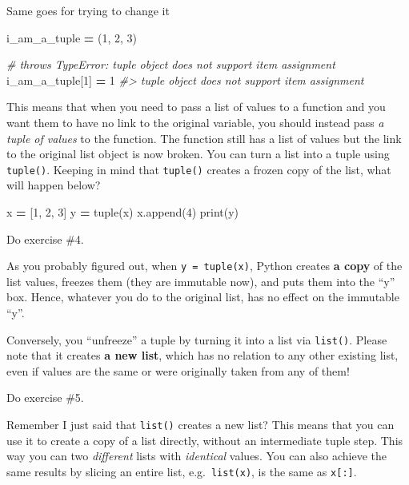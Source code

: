 \documentclass[
]{book}
\newenvironment{Shaded}{\begin{snugshade}}{\end{snugshade}}
\newcommand{\BuiltInTok}[1]{#1}
\newcommand{\CommentTok}[1]{\textcolor[rgb]{0.56,0.35,0.01}{\textit{#1}}}
\newcommand{\DecValTok}[1]{\textcolor[rgb]{0.00,0.00,0.81}{#1}}
\newcommand{\NormalTok}[1]{#1}
\newcommand{\OperatorTok}[1]{\textcolor[rgb]{0.81,0.36,0.00}{\textbf{#1}}}
\begin{document}
Same goes for trying to change it

\begin{Shaded}
\begin{Highlighting}[]
\NormalTok{i\_am\_a\_tuple }\OperatorTok{=}\NormalTok{ (}\DecValTok{1}\NormalTok{, }\DecValTok{2}\NormalTok{, }\DecValTok{3}\NormalTok{)}

\CommentTok{\# throws TypeError: \textquotesingle{}tuple\textquotesingle{} object does not support item assignment}
\NormalTok{i\_am\_a\_tuple[}\DecValTok{1}\NormalTok{] }\OperatorTok{=} \DecValTok{1} 
\CommentTok{\#\textgreater{} \textquotesingle{}tuple\textquotesingle{} object does not support item assignment}
\end{Highlighting}
\end{Shaded}

This means that when you need to pass a list of values to a function and you want them to have no link to the original variable, you should instead pass \emph{a tuple of values} to the function. The function still has a list of values but the link to the original list object is now broken. You can turn a list into a tuple using \texttt{tuple()}. Keeping in mind that \texttt{tuple()} creates a frozen copy of the list, what will happen below?

\begin{Shaded}
\begin{Highlighting}[]
\NormalTok{x }\OperatorTok{=}\NormalTok{ [}\DecValTok{1}\NormalTok{, }\DecValTok{2}\NormalTok{, }\DecValTok{3}\NormalTok{]}
\NormalTok{y }\OperatorTok{=} \BuiltInTok{tuple}\NormalTok{(x)}
\NormalTok{x.append(}\DecValTok{4}\NormalTok{)}
\BuiltInTok{print}\NormalTok{(y)}
\end{Highlighting}
\end{Shaded}

Do exercise \#4.

As you probably figured out, when \texttt{y\ =\ tuple(x)}, Python creates \textbf{a copy} of the list values, freezes them (they are immutable now), and puts them into the ``y'' box. Hence, whatever you do to the original list, has no effect on the immutable ``y''.

Conversely, you ``unfreeze'' a tuple by turning it into a list via \texttt{list()}. Please note that it creates \textbf{a new list}, which has no relation to any other existing list, even if values are the same or were originally taken from any of them!

Do exercise \#5.

Remember I just said that \texttt{list()} creates a new list? This means that you can use it to create a copy of a list directly, without an intermediate tuple step. This way you can two \emph{different} lists with \emph{identical} values. You can also achieve the same results by slicing an entire list, e.g.~\texttt{list(x)}, is the same as \texttt{x{[}:{]}}.
\end{document}

